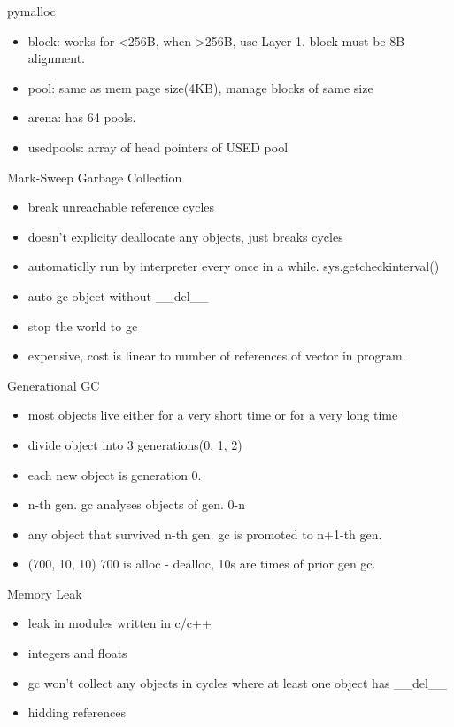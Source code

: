 \documentclass[xcolor=svgnames]{beamer}
\begin{document}
\begin{frame}{pymalloc}
\begin{itemize} 
  \item block: works for <256B, when >256B, use Layer 1. block must be 8B alignment.
  \item pool: same as mem page size(4KB), manage blocks of same size
  \item arena: has 64 pools.
  \item usedpools: array of head pointers of USED pool
\end{itemize} 
\end{frame}

\begin{frame}{Mark-Sweep Garbage Collection}
\begin{itemize} 
  \item break unreachable reference cycles
  \item doesn't explicity deallocate any objects, just breaks cycles
  \item automaticlly run by interpreter every once in a while. sys.getcheckinterval()
  \item auto gc object without \_\_del\_\_
  \item stop the world to gc
  \item expensive, cost is linear to number of references of vector in program.
\end{itemize} 
\end{frame}

\begin{frame}{Generational GC}
\begin{itemize}
  \item most objects live either for a very short time or for a very long time
  \item divide object into 3 generations(0, 1, 2)
  \item each new object is generation 0.
  \item n-th gen. gc analyses objects of gen. 0-n
  \item any object that survived n-th gen. gc is promoted to n+1-th gen.
  \item (700, 10, 10) 700 is alloc - dealloc, 10s are times of prior gen gc.
\end{itemize}
\end{frame}

\begin{frame}{Memory Leak}
\begin{itemize}
  \item leak in modules written in c/c++
  \item integers and floats
  \item gc won't collect any objects in cycles where at least one object has \_\_del\_\_
  \item hidding references
\end{itemize}
\end{frame}
\end{document}

